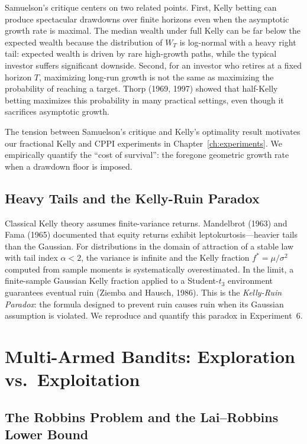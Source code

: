 Samuelson's critique centers on two related points.  First, Kelly betting can
produce spectacular drawdowns over finite horizons even when the asymptotic
growth rate is maximal.  The median wealth under full Kelly can be far below
the expected wealth because the distribution of $W_T$ is log-normal with a
heavy right tail: expected wealth is driven by rare high-growth paths, while
the typical investor suffers significant downside.  Second, for an investor
who retires at a fixed horizon $T$, maximizing long-run growth is not the same
as maximizing the probability of reaching a target.  Thorp (1969, 1997) showed
that half-Kelly betting maximizes this probability in many practical settings,
even though it sacrifices asymptotic growth.

The tension between Samuelson's critique and Kelly's optimality result
motivates our fractional Kelly and CPPI experiments in
Chapter~\ref{ch:experiments}.  We empirically quantify the ``cost of
survival'': the foregone geometric growth rate when a drawdown floor is
imposed.

\subsection{Heavy Tails and the Kelly-Ruin Paradox}

Classical Kelly theory assumes finite-variance returns.  Mandelbrot (1963) and
Fama (1965) documented that equity returns exhibit leptokurtosis---heavier
tails than the Gaussian.  For distributions in the domain of attraction of a
stable law with tail index $\alpha < 2$, the variance is infinite and the Kelly
fraction $f^* = \mu/\sigma^2$ computed from sample moments is systematically
overestimated.  In the limit, a finite-sample Gaussian Kelly fraction applied
to a Student-$t_3$ environment guarantees eventual ruin (Ziemba and Hausch,
1986).  This is the \emph{Kelly-Ruin Paradox}: the formula designed to prevent
ruin causes ruin when its Gaussian assumption is violated.  We reproduce and
quantify this paradox in Experiment~6.

\section{Multi-Armed Bandits: Exploration vs.\ Exploitation}

\subsection{The Robbins Problem and the Lai--Robbins Lower Bound}

